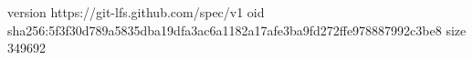 version https://git-lfs.github.com/spec/v1
oid sha256:5f3f30d789a5835dba19dfa3ac6a1182a17afe3ba9fd272ffe978887992c3be8
size 349692
